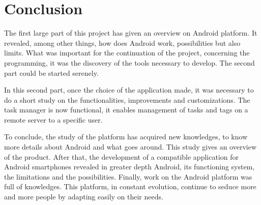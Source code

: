 \chapter{Conclusion}

\vspace{2cm}

\noindent The first large part of this project has given an overview on Android platform. It revealed, among other things, how does Android work, possibilities but also limits. What was important for the continuation of the project, concerning the programming, it was the discovery of the tools necessary to develop. The second part could be started serenely.

\noindent In this second part, once the choice of the application made, it was necessary to do a short study on the functionalities, improvements and customizations. The task manager is now functional, it enables management of tasks and tags on a remote server to a specific user.

\noindent To conclude, the study of the platform has acquired new knowledges, to know more details about Android and what goes around. This study gives an overview of the product.
After that, the development of a compatible application for Android smartphones revealed in greater depth Android, its functioning system, the limitations and the possibilities.
Finally, work on the Android platform was full of knowledges. This platform, in constant evolution, continue to seduce more and more people by adapting easily on their needs.


\clearpage

